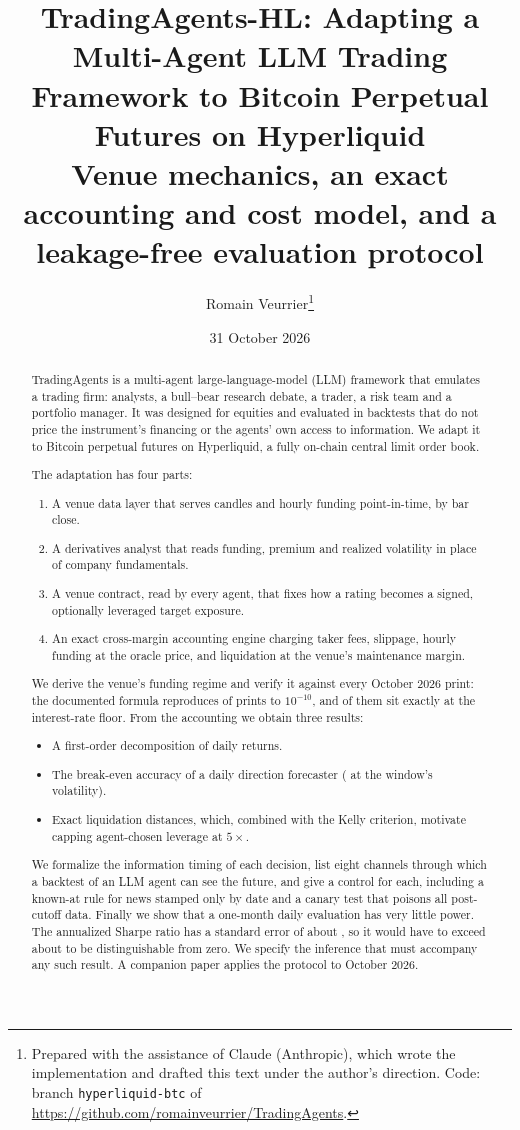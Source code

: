 \documentclass[11pt]{article}
\title{\textbf{TradingAgents-HL: Adapting a Multi-Agent LLM Trading Framework to Bitcoin Perpetual Futures on Hyperliquid}\\[0.4em]
\large Venue mechanics, an exact accounting and cost model, and a leakage-free evaluation protocol}
\author{Romain Veurrier\thanks{Prepared with the assistance of Claude (Anthropic), which wrote the implementation and drafted this text under the author's direction. Code: branch \texttt{hyperliquid-btc} of \url{https://github.com/romainveurrier/TradingAgents}.}}
\date{31 October 2026}
\theoremstyle{remark}
\begin{document}
\maketitle

\begin{abstract}
TradingAgents is a multi-agent large-language-model (LLM) framework that emulates a trading firm: analysts, a bull--bear research debate, a trader, a risk team and a portfolio manager. It was designed for equities and evaluated in backtests that do not price the instrument's financing or the agents' own access to information. We adapt it to Bitcoin perpetual futures on Hyperliquid, a fully on-chain central limit order book.

The adaptation has four parts:
\begin{enumerate}
\item A venue data layer that serves candles and hourly funding point-in-time, by bar close.
\item A derivatives analyst that reads funding, premium and realized volatility in place of company fundamentals.
\item A venue contract, read by every agent, that fixes how a rating becomes a signed, optionally leveraged target exposure.
\item An exact cross-margin accounting engine charging taker fees, slippage, hourly funding at the oracle price, and liquidation at the venue's maintenance margin.
\end{enumerate}

We derive the venue's funding regime and verify it against every October 2026 print: the documented formula reproduces \FundMatch{} of \FundPrints{} prints to $10^{-10}$, and \FundBase{} of them sit exactly at the interest-rate floor. From the accounting we obtain three results:
\begin{itemize}
\item A first-order decomposition of daily returns.
\item The break-even accuracy of a daily direction forecaster (\PowBreakeven{} at the window's volatility).
\item Exact liquidation distances, which, combined with the Kelly criterion, motivate capping agent-chosen leverage at $5\times$.
\end{itemize}

We formalize the information timing of each decision, list eight channels through which a backtest of an LLM agent can see the future, and give a control for each, including a known-at rule for news stamped only by date and a canary test that poisons all post-cutoff data. Finally we show that a one-month daily evaluation has very little power. The annualized Sharpe ratio has a standard error of about \PowSE{}, so it would have to exceed about \PowMinSR{} to be distinguishable from zero. We specify the inference that must accompany any such result. A companion paper applies the protocol to October 2026.
\end{abstract}
\end{document}
